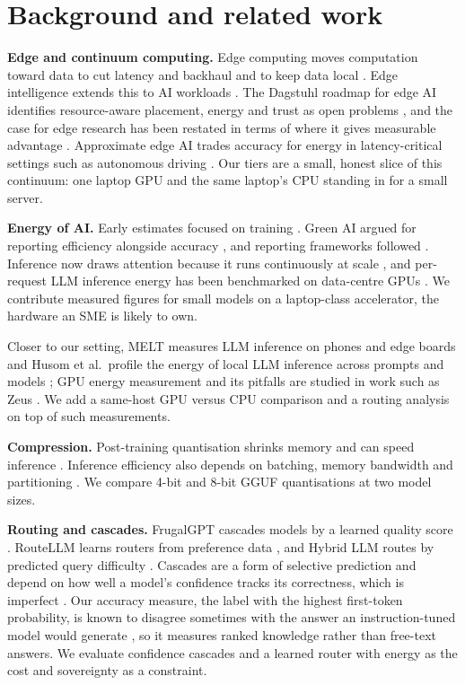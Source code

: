 \documentclass[10pt,twocolumn]{article}
\begin{document}
\section{Background and related work}
\textbf{Edge and continuum computing.} Edge computing moves computation toward data to cut latency and backhaul and to keep data local \cite{satya2017,shi2016}. Edge intelligence extends this to AI workloads \cite{deng2020}. The Dagstuhl roadmap for edge AI identifies resource-aware placement, energy and trust as open problems \cite{ding2022roadmap}, and the case for edge research has been restated in terms of where it gives measurable advantage \cite{varghese2021}. Approximate edge AI trades accuracy for energy in latency-critical settings such as autonomous driving \cite{katare2023}. Our tiers are a small, honest slice of this continuum: one laptop GPU and the same laptop's CPU standing in for a small server.

\textbf{Energy of AI.} Early estimates focused on training \cite{strubell2019,patterson2021}. Green AI argued for reporting efficiency alongside accuracy \cite{schwartz2020}, and reporting frameworks followed \cite{henderson2020,lannelongue2021}. Inference now draws attention because it runs continuously at scale \cite{wu2022,luccioni2024}, and per-request LLM inference energy has been benchmarked on data-centre GPUs \cite{samsi2023}. We contribute measured figures for small models on a laptop-class accelerator, the hardware an SME is likely to own.

Closer to our setting, MELT measures LLM inference on phones and edge boards \cite{melt2024} and Husom et al.\ profile the energy of local LLM inference across prompts and models \cite{husom2024}; GPU energy measurement and its pitfalls are studied in work such as Zeus \cite{zeus2023}. We add a same-host GPU versus CPU comparison and a routing analysis on top of such measurements.

\textbf{Compression.} Post-training quantisation shrinks memory and can speed inference \cite{dettmers2022,frantar2022,lin2023}. Inference efficiency also depends on batching, memory bandwidth and partitioning \cite{pope2022}. We compare 4-bit and 8-bit GGUF quantisations at two model sizes.

\textbf{Routing and cascades.} FrugalGPT cascades models by a learned quality score \cite{frugalgpt}. RouteLLM learns routers from preference data \cite{routellm}, and Hybrid LLM routes by predicted query difficulty \cite{hybridllm}. Cascades are a form of selective prediction \cite{geifman2017} and depend on how well a model's confidence tracks its correctness, which is imperfect \cite{guo2017,kadavath2022}. Our accuracy measure, the label with the highest first-token probability, is known to disagree sometimes with the answer an instruction-tuned model would generate \cite{wang2024firsttoken}, so it measures ranked knowledge rather than free-text answers. We evaluate confidence cascades and a learned router with energy as the cost and sovereignty as a constraint.
\end{document}
